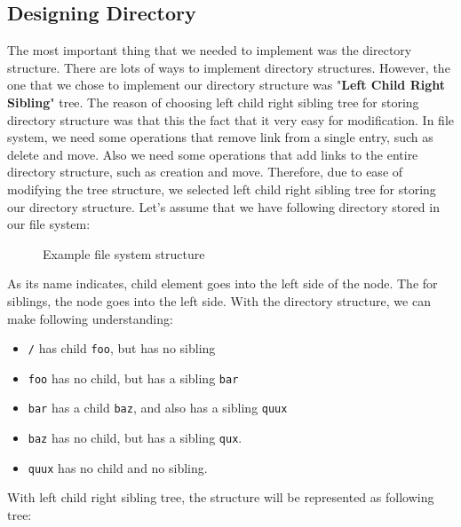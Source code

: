 \documentclass{homework}
\begin{document}
\subsection{Designing Directory}
The most important thing that we needed to implement was the directory structure. There are lots of ways to implement directory structures. However, the one that we chose to implement our directory structure was "\textbf{Left Child Right Sibling}" tree. The reason of choosing left child right sibling tree for storing directory structure was that this the fact that it very easy for modification. In file system, we need some operations that remove link from a single entry, such as delete and move. Also we need some operations that add links to the entire directory structure, such as creation and move. Therefore, due to ease of modifying the tree structure, we selected left child right sibling tree for storing our directory structure. Let's assume that we have following directory stored in our file system:

\begin{figure}[h]
\begin{center}
\begin{minipage}{7cm}
\end{minipage}
\end{center}
\caption{Example file system structure}
\end{figure}

As its name indicates, child element goes into the left side of the node. The for siblings, the node goes into the left side. With the directory structure, we can make following understanding:
\begin{itemize}
    \item \texttt{/} has child \texttt{foo}, but has no sibling
    \item \texttt{foo} has no child, but has a sibling \texttt{bar}
    \item \texttt{bar} has a child \texttt{baz}, and also has a sibling \texttt{quux}
    \item \texttt{baz} has no child, but has a sibling \texttt{qux}.
    \item \texttt{quux} has no child and no sibling.
\end{itemize}


With left child right sibling tree, the structure will be represented as following tree:
\end{document}
